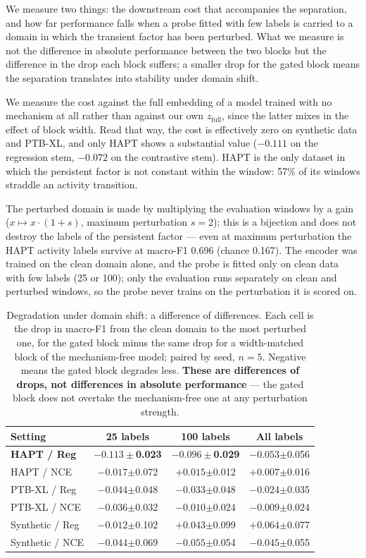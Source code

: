 We measure two things: the downstream cost that accompanies the separation, and how far performance falls when a probe fitted with few labels is carried to a domain in which the transient factor has been perturbed. What we measure is not the difference in absolute performance between the two blocks but the difference in the drop each block suffers; a smaller drop for the gated block means the separation translates into stability under domain shift.



We measure the cost against the full embedding of a model trained with no mechanism at all rather than against our own $z_{\mathrm{full}}$, since the latter mixes in the effect of block width. Read that way, the cost is effectively zero on synthetic data and PTB-XL, and only HAPT shows a substantial value ($-0.111$ on the regression stem, $-0.072$ on the contrastive stem). HAPT is the only dataset in which the persistent factor is not constant within the window: 57\% of its windows straddle an activity transition.

The perturbed domain is made by multiplying the evaluation windows by a gain ($x \mapsto x\cdot(1+s)$, maximum perturbation $s=2$); this is a bijection and does not destroy the labels of the persistent factor --- even at maximum perturbation the HAPT activity labels survive at macro-F1 0.696 (chance 0.167). The encoder was trained on the clean domain alone, and the probe is fitted only on clean data with few labels (25 or 100); only the evaluation runs separately on clean and perturbed windows, so the probe never trains on the perturbation it is scored on.

\begin{table}[!tbp]
\caption{Degradation under domain shift: a difference of differences. Each cell is the drop in macro-F1 from the clean domain to the most perturbed one, for the gated block minus the same drop for a width-matched block of the mechanism-free model; paired by seed, $n=5$. Negative means the gated block degrades less. \textbf{These are differences of drops, not differences in absolute performance} --- the gated block does not overtake the mechanism-free one at any perturbation strength.}
\label{tab:shift}
\centering
\small
\begin{tabular}{lccc}
\hline
Setting & 25 labels & 100 labels & All labels \\
\hline
\textbf{HAPT / Reg} & $\mathbf{-0.113}\pm$\textbf{0.023} & $\mathbf{-0.096}\pm$\textbf{0.029} & $-0.053$$\pm$0.056 \\
HAPT / NCE & $-0.017$$\pm$0.072 & $+0.015$$\pm$0.012 & $+0.007$$\pm$0.016 \\
PTB-XL / Reg & $-0.044$$\pm$0.048 & $-0.033$$\pm$0.048 & $-0.024$$\pm$0.035 \\
PTB-XL / NCE & $-0.036$$\pm$0.032 & $-0.010$$\pm$0.024 & $-0.009$$\pm$0.024 \\
Synthetic / Reg & $-0.012$$\pm$0.102 & $+0.043$$\pm$0.099 & $+0.064$$\pm$0.077 \\
Synthetic / NCE & $-0.044$$\pm$0.069 & $-0.055$$\pm$0.054 & $-0.045$$\pm$0.055 \\
\hline
\end{tabular}
\end{table}

